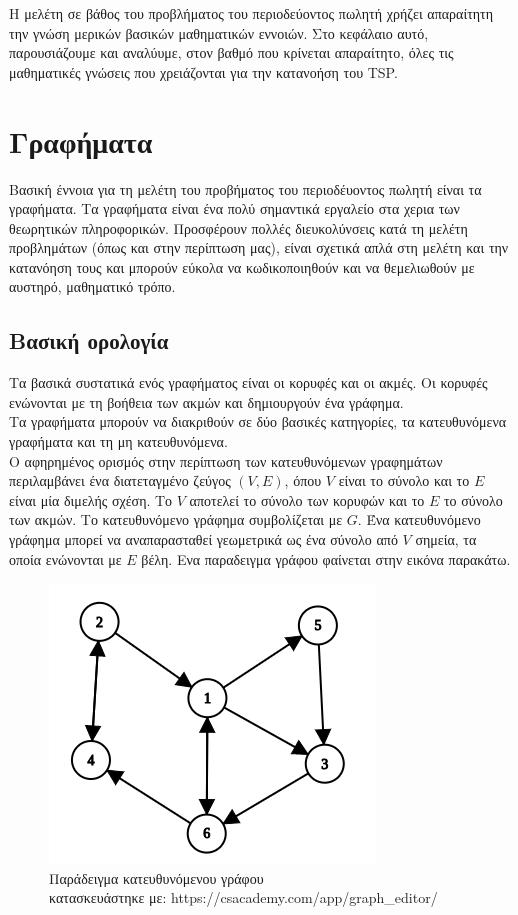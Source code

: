 \documentclass[oneside,12pt]{book}
\newenvironment{matlab}
	{\begin{figure}[hp]\centering\captionsetup{justification=centering}}
	{\end{figure}}
\theoremstyle{definition}
\begin{document}
Η μελέτη σε βάθος του προβλήματος του περιοδεύοντος πωλητή χρήζει απαραίτητη την γνώση μερικών βασικών μαθηματικών εννοιών. Στο κεφάλαιο αυτό, παρουσιάζουμε και αναλύυμε, στον βαθμό που κρίνεται απαραίτητο, όλες τις μαθηματικές γνώσεις που χρειάζονται για την κατανοήση του TSP. \\

\section{Γραφήματα}

Βασική έννοια για τη μελέτη του προβήματος του περιοδέυοντος πωλητή είναι τα γραφήματα. Τα γραφήματα είναι ένα πολύ σημαντικά εργαλείο στα χερια των θεωρητικών πληροφορικών. Προσφέρουν πολλές διευκολύνσεις κατά τη μελέτη προβλημάτων (όπως και στην περίπτωση μας), είναι σχετικά απλά στη μελέτη και την κατανόηση τους και μπορούν εύκολα να κωδικοποιηθούν και να θεμελιωθούν με αυστηρό, μαθηματικό τρόπο. \\

\subsection{Βασική ορολογία}

Τα βασικά συστατικά ενός γραφήματος είναι  οι κορυφές και οι ακμές. Οι κορυφές ενώνονται με τη βοήθεια των ακμών και δημιουργούν ένα γράφημα. \\

Τα γραφήματα μπορούν να διακριθούν σε δύο βασικές κατηγορίες, τα κατευθυνόμενα γραφήματα και τη μη κατευθυνόμενα. \\

Ο αφηρημένος ορισμός στην περίπτωση των κατευθυνόμενων γραφημάτων περιλαμβάνει ένα διατεταγμένο ζεύγος \((V,E)\), όπου \(V\) είναι το σύνολο και το \(E\) είναι μία διμελής σχέση. Το \(V\) αποτελεί το σύνολο των κορυφών και το \(E\) το σύνολο των ακμών. Το κατευθυνόμενο γράφημα συμβολίζεται με \(G\). Ένα κατευθυνόμενο γράφημα μπορεί να αναπαρασταθεί γεωμετρικά ως ένα σύνολο από \(V\) σημεία, τα οποία ενώνονται με \(E\) βέλη. Ενα παραδειγμα γράφου φαίνεται στην εικόνα παρακάτω.

\begin{matlab}
	\includegraphics[scale=0.8]{images/directed_graph_example.png}
	\caption{Παράδειγμα κατευθυνόμενου γράφου \\ κατασκευάστηκε με: https://csacademy.com/app/graph\_editor/}
\end{matlab} 
\end{document}
